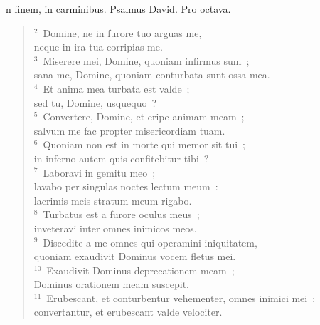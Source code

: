 \bchapter
{}n finem, in carminibus. Psalmus David. Pro octava.
\begin{flushleft}\begin{verse}\vspace{6pt}${}^{2}$~Domine, ne in furore tuo arguas me,\\ neque in ira tua corripias me.\\
${}^{3}$~Miserere mei, Domine, quoniam infirmus sum~;\\ sana me, Domine, quoniam conturbata sunt ossa mea.\\
${}^{4}$~Et anima mea turbata est valde~;\\ sed tu, Domine, usquequo~?\\
${}^{5}$~Convertere, Domine, et eripe animam meam~;\\ salvum me fac propter misericordiam tuam.\\
${}^{6}$~Quoniam non est in morte qui memor sit tui~;\\ in inferno autem quis confitebitur tibi~?\\
${}^{7}$~Laboravi in gemitu meo~;\\ lavabo per singulas noctes lectum meum~:\\ lacrimis meis stratum meum rigabo.\\
${}^{8}$~Turbatus est a furore oculus meus~;\\ inveteravi inter omnes inimicos meos.\\
${}^{9}$~Discedite a me omnes qui operamini iniquitatem,\\ quoniam exaudivit Dominus vocem fletus mei.\\
${}^{10}$~Exaudivit Dominus deprecationem meam~;\\ Dominus orationem meam suscepit.\\
${}^{11}$~Erubescant, et conturbentur vehementer, omnes inimici mei~;\\ convertantur, et erubescant valde velociter.\end{verse}\end{flushleft}



